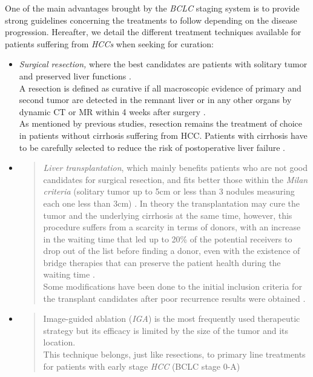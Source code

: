 \documentclass[]{article}
\begin{document}
One of the main advantages brought by the \emph{BCLC} staging system is
to provide strong guidelines concerning the treatments to follow
depending on the disease progression.
Hereafter, we detail the different treatment techniques available for
patients suffering from \emph{HCCs} when seeking for curation:
\begin{itemize}
\item \emph{Surgical resection,} where the best candidates are patients with
  solitary tumor and preserved liver functions \cite{Forner2018}.\\
  A resection is defined as curative if all macroscopic evidence of
  primary and second tumor are detected in the remnant liver or in any
  other organs by dynamic CT or MR within 4 weeks after surgery
  \cite{Yang2012}.\\
  As mentioned by previous studies, resection remains the treatment of
  choice in patients without cirrhosis suffering from HCC. Patients with
  cirrhosis have to be carefully selected to reduce the risk of
  postoperative liver failure \cite{Bruix2011,Llovet2012,Verslype2012}.
\item
  \begin{quote}
  \emph{Liver transplantation}, which mainly benefits patients who are
  not good candidates for surgical resection, and fits better those
  within the \emph{Milan criteria} (solitary tumor up to 5cm or less
  than 3 nodules measuring each one less than 3cm) \cite{Llovet2012,Mazzaferro2011}. In theory the transplantation may cure the
  tumor and the underlying cirrhosis at the same time, however, this
  procedure suffers from a scarcity in terms of donors, with an increase
  in the waiting time that led up to 20\% of the potential receivers to
  drop out of the list before finding a donor, even with the existence
  of bridge therapies that can preserve the patient health during the
  waiting time \cite{Llovet1999}.\\
  Some modifications have been done to the initial inclusion criteria
  for the transplant candidates after poor recurrence results were
  obtained \cite{Llovet2012}.
  \end{quote}
\item
  \begin{quote}
  Image-guided ablation (\emph{IGA}) is the most frequently used
  therapeutic strategy but its efficacy is limited by the size of the
  tumor and its location.\\
  This technique belongs, just like resections, to primary line
  treatments for patients with early stage \emph{HCC} (BCLC stage 0-A)

\end{quote}
\end{itemize}
\end{document}
